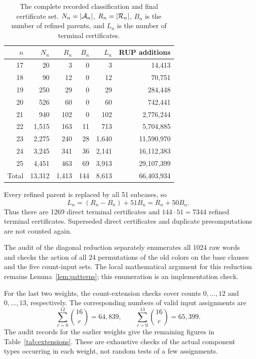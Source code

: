 \begin{table}[H]
\centering
\caption{The complete recorded classification and final certificate set.
$N_n=|\mathcal{A}_n|$, $R_n=|\mathcal{R}_n|$, $B_n$ is the number of refined parents,
and $L_n$ is the number of terminal certificates.}\label{tab:counts}
\small
\begin{tabular}{@{}rrrrrr@{}}
\toprule
$n$&$N_n$&$R_n$&$B_n$&$L_n$&RUP additions\\
\midrule
17&20&3&0&3&14,413\\
18&90&12&0&12&70,751\\
19&250&29&0&29&284,448\\
20&526&60&0&60&742,441\\
21&940&102&0&102&2,776,244\\
22&1,515&163&11&713&5,704,885\\
23&2,275&240&28&1,640&11,590,970\\
24&3,245&341&36&2,141&16,112,383\\
25&4,451&463&69&3,913&29,107,399\\
\midrule
Total&13,312&1,413&144&8,613&66,403,934\\
\bottomrule
\end{tabular}
\end{table}

Every refined parent is replaced by all 51 subcases, so
\begin{equation}\label{eq:leaf-count}
L_n=(R_n-B_n)+51B_n=R_n+50B_n.
\end{equation}
Thus there are 1269 direct terminal certificates and $144\cdot51=7344$
refined terminal certificates. Superseded direct certificates and duplicate
precomputations are not counted again.

The audit of the diagonal reduction separately enumerates all 1024 raw
words and checks the action of all 24 permutations of the old colors on
the base clauses and the five count-input sets. The local mathematical
argument for this reduction remains Lemma~\ref{lem:patterns}; this
enumeration is an implementation check.

For the last two weights, the count-extension checks cover counts
$0,\ldots,12$ and $0,\ldots,13$, respectively. The corresponding numbers
of valid input assignments are
\[
\sum_{r=0}^{12}\binom{16}{r}=64,839,
\qquad
\sum_{r=0}^{13}\binom{16}{r}=65,399.
\]
The audit records for the earlier weights give the remaining figures in
Table~\ref{tab:extensions}. These are exhaustive checks of the actual
component types occurring in each weight, not random tests of a few
assignments.

